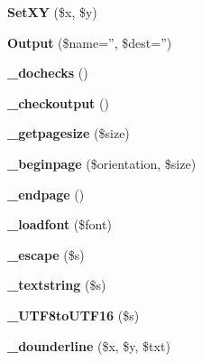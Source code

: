 \begin{DoxyCompactItemize}
\item 
\hypertarget{classFPDF_a2c191daee30b7ea3a66696bd0be92a3e}{{\bfseries Set\+X\+Y} (\$x, \$y)}\label{classFPDF_a2c191daee30b7ea3a66696bd0be92a3e}

\item 
\hypertarget{classFPDF_ac4e0bfb71d9e602637c67016e4b5dd40}{{\bfseries Output} (\$name='', \$dest='')}\label{classFPDF_ac4e0bfb71d9e602637c67016e4b5dd40}

\item 
\hypertarget{classFPDF_a1ce404a00709a07ca9851b91aefbb0c4}{{\bfseries \+\_\+dochecks} ()}\label{classFPDF_a1ce404a00709a07ca9851b91aefbb0c4}

\item 
\hypertarget{classFPDF_aae8f75d4fcd8774b6663c378cf2a32e4}{{\bfseries \+\_\+checkoutput} ()}\label{classFPDF_aae8f75d4fcd8774b6663c378cf2a32e4}

\item 
\hypertarget{classFPDF_aca25fc93dd33864413e1bfb8665ccc2a}{{\bfseries \+\_\+getpagesize} (\$size)}\label{classFPDF_aca25fc93dd33864413e1bfb8665ccc2a}

\item 
\hypertarget{classFPDF_ac1ce0e0dd9cad852a78b4df4db4db3d6}{{\bfseries \+\_\+beginpage} (\$orientation, \$size)}\label{classFPDF_ac1ce0e0dd9cad852a78b4df4db4db3d6}

\item 
\hypertarget{classFPDF_a0c727a46d970b65e123da12e3cb34b58}{{\bfseries \+\_\+endpage} ()}\label{classFPDF_a0c727a46d970b65e123da12e3cb34b58}

\item 
\hypertarget{classFPDF_a17b92aa9a0bf565520693a801edab6aa}{{\bfseries \+\_\+loadfont} (\$font)}\label{classFPDF_a17b92aa9a0bf565520693a801edab6aa}

\item 
\hypertarget{classFPDF_a315a57aaf556052008dd99ff196b812e}{{\bfseries \+\_\+escape} (\$s)}\label{classFPDF_a315a57aaf556052008dd99ff196b812e}

\item 
\hypertarget{classFPDF_a7a9f870d2548f450a8bc90f59b96656d}{{\bfseries \+\_\+textstring} (\$s)}\label{classFPDF_a7a9f870d2548f450a8bc90f59b96656d}

\item 
\hypertarget{classFPDF_ae0d452fb23ac5d8bf11c17fbb96824ac}{{\bfseries \+\_\+\+U\+T\+F8to\+U\+T\+F16} (\$s)}\label{classFPDF_ae0d452fb23ac5d8bf11c17fbb96824ac}

\item 
\hypertarget{classFPDF_a35c042a9f396daa571e91a16ea65edc4}{{\bfseries \+\_\+dounderline} (\$x, \$y, \$txt)}\label{classFPDF_a35c042a9f396daa571e91a16ea65edc4}


\end{DoxyCompactItemize}
